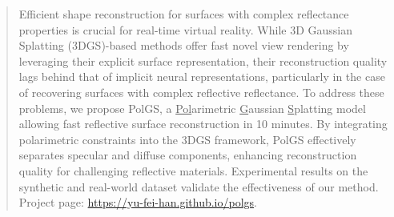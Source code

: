 
\begin{abstract}
	Efficient shape reconstruction for surfaces with complex reflectance properties is crucial for real-time
	 virtual reality. While 3D Gaussian Splatting (3DGS)-based methods offer fast novel view rendering
	  by leveraging their explicit surface representation, their reconstruction quality lags behind that of implicit neural representations, particularly in the case of recovering surfaces with complex reflective reflectance.
	    To address these problems, we propose PolGS, a \underline{Pol}arimetric \underline{G}aussian \underline{S}platting 
		model allowing fast reflective surface reconstruction in 10 minutes. By integrating polarimetric constraints into the 
		3DGS framework, PolGS effectively separates specular and diffuse components, enhancing reconstruction quality for 
		challenging reflective materials. Experimental results on the synthetic and real-world dataset validate the effectiveness of our method.
		Project page: \href{https://yu-fei-han.github.io/polgs}{https://yu-fei-han.github.io/polgs}.
\end{abstract}
\vspace{-1em}